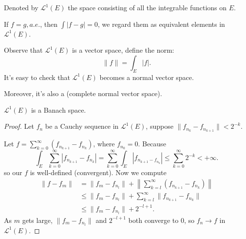 \begin{definition}
	Denoted by $\mathcal{L}^1(E)$ the space consisting of
	all the integrable functions on $E$.

	If $f=g, a.e.$, then  $\int |f-g| = 0$, we regard them as equivalent elements
	in  $\mathcal{L}^1(E)$.

	Observe that $\mathcal{L}^1(E)$ is a vector space, define the norm:
	\[
	\lVert f \rVert = \int_E |f|.
	\]
	It's easy to check that $\mathcal{L}^1(E)$ becomes a normal vector space.

	Moreover, it's also a  (complete normal vector space).
\end{definition}
\begin{theorem}
    $\mathcal{L}^1(E)$ is a Banach space.
\end{theorem}
\begin{proof}[Proof]
    Let $f_n$ be a Cauchy sequence in  $\mathcal{L}^1(E)$,
	suppose $\lVert f_{n_k} - f_{n_{k+1}} \rVert < 2^{-k}$.

	Let $f = \sum_{k=0}^{\infty} (f_{n_{k+1}} - f_{n_{k}})$, where $f_{n_0} = 0$.
	Because
	\[
	\int _E \sum_{k=0}^{\infty} |f_{n_{k+1}} - f_{n_{k}}|
	= \sum_{k=0}^{\infty} \int_E |f_{n_{k+1}-f_{n_k}}| \le \sum_{k=0}^{\infty} 2^{-k}
	< +\infty.
	\]
	so our $f$ is well-defined (convergent).
	Now we compute
	\begin{align*}
		\lVert f-f_m \rVert
		&= \lVert f_m - f_{n_l} \rVert +
		\left\lVert \sum_{k=l}^{\infty} (f_{n_{k+1}} - f_{n_k}) \right\rVert\\
		&\le \lVert f_m - f_{n_l} \rVert +
		\sum_{k=l}^{\infty} \lVert f_{n_{k+1}}-f_{n_k}\rVert\\
		&\le \lVert f_m - f_{n_l} \rVert + 2^{-l+1}.
	\end{align*}
	As $m$ gets large, $\lVert f_m - f_{n_l} \rVert$ and $2^{-l+1}$ both
	converge to $0$, so $f_n\to f$ in $\mathcal{L}^1(E)$.
\end{proof}
